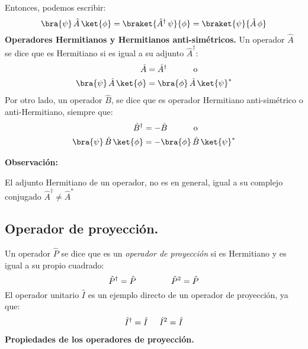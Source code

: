 Entonces, podemos escribir:
\begin{equation}
\bra{\psi} \, \hat{A} \, \ket{\phi} = \braket{\hat{A}^{\dagger} \, \psi}{\phi} = \braket{\psi}{\hat{A} \, \phi}
\label{eq:ecuacion_02_69}
\end{equation}
\textbf{Operadores Hermitianos y Hermitianos anti-simétricos.}
Un operador $\hat{A}$ se dice que es Hermitiano si es igual a su adjunto $\hat{A}^{\dagger}$:
\begin{align}
\begin{aligned}
\hat{A} &= \hat{A}^{\dagger}  \hspace{1cm} \mbox{ o } \\
\bra{\psi} \, \hat{A} \, \ket{\phi} &= \bra{\phi} \, \hat{A} \, \ket{\psi}^{*}
\end{aligned}
\label{eq:ecuacion_02_70}
\end{align}
Por otro lado, un operador $\hat{B}$, se dice que es operador Hermitiano anti-simétrico o anti-Hermitiano, siempre que:
\begin{align}
\begin{aligned}
\hat{B}^{\dagger} &= - \hat{B}  \hspace{1cm} \mbox{ o } \\
\bra{\psi} \, \hat{B} \, \ket{\phi} &= - \bra{\phi} \, \hat{B} \, \ket{\psi}^{*}
\end{aligned}
\label{eq:ecuacion_02_71}
\end{align}

\textbf{Observación: }

El adjunto Hermitiano de un operador, no es en general, igual a su complejo conjugado $\hat{A}^{\dagger} \neq \hat{A}^{*}$
\subsection{Operador de proyección.}
Un operador $\hat{P}$ se dice que es un \emph{operador de proyección} si es Hermitiano y es igual a su propio cuadrado:
\begin{equation}
\hat{P}^{\dagger} = \hat{P} \hspace{1.5cm} \hat{P}^{2} = \hat{P}
\label{eq:ecuacion_02_76}
\end{equation}
El operador unitario $\hat{I}$ es un ejemplo directo de un operador de proyección, ya que: 
\begin{align*}
\hat{I}^{\dagger} = \hat{I} \hspace{0.5cm} \hat{I}^{2} = \hat{I}
\end{align*}
\textbf{Propiedades de los operadores de proyección.}

